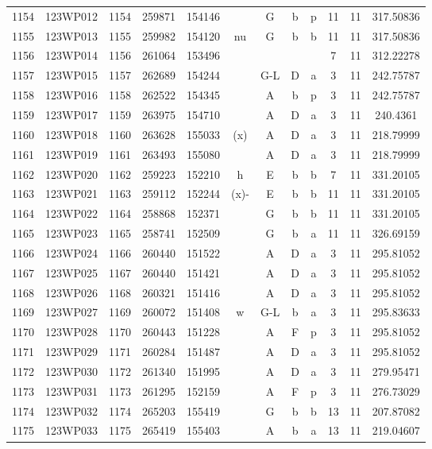 \begin{tabular}{|*{12}{c|}}
1154 & 123WP012 & 1154 & 259871 & 154146 &  & G & b & p & 11 & 11 & 317.50836 \\ 
1155 & 123WP013 & 1155 & 259982 & 154120 & nu & G & b & b & 11 & 11 & 317.50836 \\ 
1156 & 123WP014 & 1156 & 261064 & 153496 &  &  &  &  & 7 & 11 & 312.22278 \\ 
1157 & 123WP015 & 1157 & 262689 & 154244 &  & G-L & D & a & 3 & 11 & 242.75787 \\ 
1158 & 123WP016 & 1158 & 262522 & 154345 &  & A & b & p & 3 & 11 & 242.75787 \\ 
1159 & 123WP017 & 1159 & 263975 & 154710 &  & A & D & a & 3 & 11 & 240.4361 \\ 
1160 & 123WP018 & 1160 & 263628 & 155033 & (x) & A & D & a & 3 & 11 & 218.79999 \\ 
1161 & 123WP019 & 1161 & 263493 & 155080 &  & A & D & a & 3 & 11 & 218.79999 \\ 
1162 & 123WP020 & 1162 & 259223 & 152210 & h & E & b & b & 7 & 11 & 331.20105 \\ 
1163 & 123WP021 & 1163 & 259112 & 152244 & (x)- & E & b & b & 11 & 11 & 331.20105 \\ 
1164 & 123WP022 & 1164 & 258868 & 152371 &  & G & b & b & 11 & 11 & 331.20105 \\ 
1165 & 123WP023 & 1165 & 258741 & 152509 &  & G & b & a & 11 & 11 & 326.69159 \\ 
1166 & 123WP024 & 1166 & 260440 & 151522 &  & A & D & a & 3 & 11 & 295.81052 \\ 
1167 & 123WP025 & 1167 & 260440 & 151421 &  & A & D & a & 3 & 11 & 295.81052 \\ 
1168 & 123WP026 & 1168 & 260321 & 151416 &  & A & D & a & 3 & 11 & 295.81052 \\ 
1169 & 123WP027 & 1169 & 260072 & 151408 & w & G-L & b & a & 3 & 11 & 295.83633 \\ 
1170 & 123WP028 & 1170 & 260443 & 151228 &  & A & F & p & 3 & 11 & 295.81052 \\ 
1171 & 123WP029 & 1171 & 260284 & 151487 &  & A & D & a & 3 & 11 & 295.81052 \\ 
1172 & 123WP030 & 1172 & 261340 & 151995 &  & A & D & a & 3 & 11 & 279.95471 \\ 
1173 & 123WP031 & 1173 & 261295 & 152159 &  & A & F & p & 3 & 11 & 276.73029 \\ 
1174 & 123WP032 & 1174 & 265203 & 155419 &  & G & b & b & 13 & 11 & 207.87082 \\ 
1175 & 123WP033 & 1175 & 265419 & 155403 &  & A & b & a & 13 & 11 & 219.04607 \\ 

\end{tabular}
